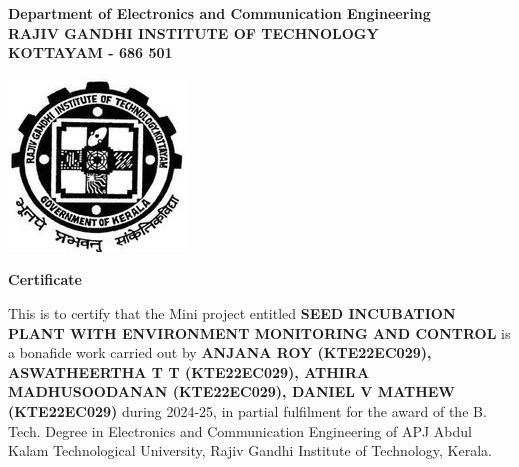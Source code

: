 \begin{center}

    {
        \large \bfseries
        Department of Electronics and Communication Engineering \\
        \vspace{10pt}
        RAJIV GANDHI INSTITUTE OF TECHNOLOGY \\
        \vspace{5pt}
        KOTTAYAM - 686 501 \\
        \vspace{5pt}
    }

    \vspace{50pt}

    \includegraphics {clg_logo.jpg}

    \vspace{40pt}

    {
        \huge \bfseries
        Certificate
    }

    \vspace{40pt}

    \begin{minipage} {0.9\textwidth}
        {
            \large
            This is to certify that the Mini project entitled
            \textbf{SEED INCUBATION PLANT WITH ENVIRONMENT MONITORING AND CONTROL}
            is a bonafide work carried out by
            \textbf{
                ANJANA ROY (KTE22EC029),
                ASWATHEERTHA T T (KTE22EC029),
                ATHIRA MADHUSOODANAN (KTE22EC029),
                DANIEL V MATHEW (KTE22EC029)
            }
            during 2024-25, in partial
            fulfilment for the award of the B. Tech. Degree in Electronics and
            Communication Engineering of APJ Abdul Kalam Technological
            University, Rajiv Gandhi Institute of Technology, Kerala.
        }
    \end{minipage}

    \vspace{30pt}


\end{center}
